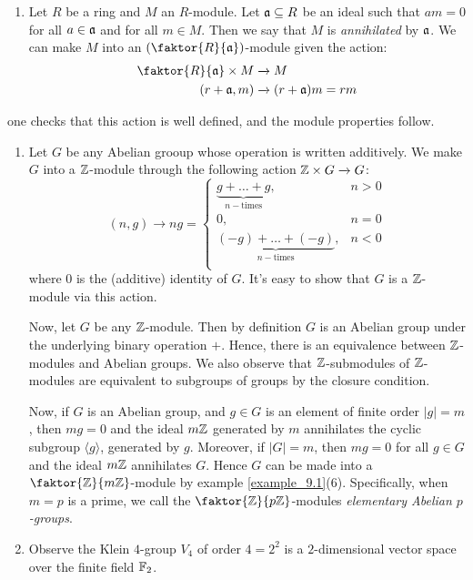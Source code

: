 \begin{example}
\begin{enumerate}
    \item[(6)] Let $R$ be a ring and $M$ an $R$-module. Let $\mathfrak{a}
      \subseteq R$ be an ideal such that $am=0$ for all  $a \in
      \mathfrak{a}$ and for all $m \in M$. Then we say that $M$ is
      \textit{annihilated} by $\mathfrak{a}$. We can make  $M$ into an
      $(\faktor{R}{\af})$-module given the action:
      \begin{align*}
        \faktor{R}{\af} \times M  & \xrightarrow{} M \\
        (r+\af, m)  & \xrightarrow{} (r+\af)m=rm  \\
      \end{align*}
  \end{enumerate}
  one checks that this action is well defined, and the module
  properties follow.
\end{example}

\begin{example}[$\Z$-modules]\label{example_9.2}
  \begin{enumerate}
    \item[(1)] Let $G$ be any Abelian grooup whose operation is written
    additively. We make $G$ into a $\Z$-module through the following
    action $\mathbb{Z} \times G \xrightarrow{} G$:
    \begin{equation*}
      (n,g) \xrightarrow{} ng=
      \begin{cases}
        \underbrace{g+\dots+g}_{n-\text{times}},  & n > 0  \\
        0,  &  n=0  \\
        \underbrace{(-g)+\dots+(-g)}_{n-\text{times}},  & n < 0  \\
      \end{cases}
    \end{equation*}
    where $0$ is the (additive) identity of $G$. It's easy to show
    that $G$ is a $\Z$-module via this action.

    Now, let $G$ be any $\Z$-module. Then by definition $G$ is an
    Abelian group under the underlying binary operation $+$. Hence,
    there is an equivalence between $\Z$-modules and Abelian groups.
    We also observe that $\Z$-submodules of $\Z$-modules are
    equivalent to subgroups of groups by the closure condition.

    Now, if $G$ is an Abelian group, and  $g \in G$ is an element of
    finite order $|g|=m$, then $mg=0$ and the ideal $m\mathbb{Z}$ generated by
    $m$ annihilates the cyclic subgroup $\langle g \rangle$, generated
    by $g$. Moreover, if $|G|=m$, then  $mg=0$ for all $g \in G$ and
    the ideal $m\mathbb{Z}$ annihilates $G$. Hence $G$ can be made into a
    $\faktor{\Z}{m\Z}$-module by example \ref{example_9.1}(6).
    Specifically, when $m=p$ is a prime, we call the
    $\faktor{\Z}{p\Z}$-modules \textit{elementary Abelian $p$-groups}.

    \item[(2)] Observe the Klein $4$-group  $V_4$ of order $4=2^2$
      is a $2$-dimensional vector space over the finite field
      $\mathbb{F}_2$.
  \end{enumerate}
\end{example}

